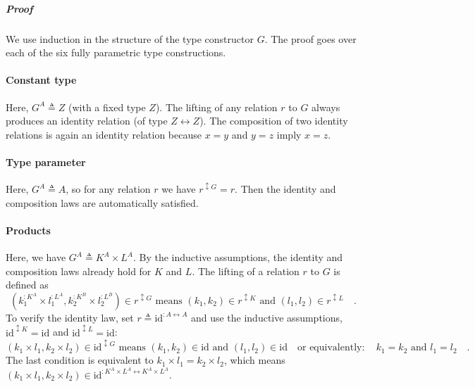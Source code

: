 \subparagraph{Proof}

We use induction in the structure of the type constructor $G$. The
proof goes over each of the six fully parametric type constructions.

\paragraph{Constant type}

Here, $G^{A}\triangleq Z$ (with a fixed type $Z$). The lifting of
any relation $r$ to $G$ always produces an identity relation (of
type $Z\leftrightarrow Z$). The composition of two identity relations
is again an identity relation because $x=y$ and $y=z$ imply $x=z$.

\paragraph{Type parameter}

Here, $G^{A}\triangleq A$, so for any relation $r$ we have $r^{\updownarrow G}=r$.
Then the identity and composition laws are automatically satisfied.

\paragraph{Products}

Here, we have $G^{A}\triangleq K^{A}\times L^{A}$. By the inductive
assumptions, the identity and composition laws already hold for $K$
and $L$. The lifting of a relation $r$ to $G$ is defined as
\[
(k_{1}^{:K^{A}}\times l_{1}^{:L^{A}},k_{2}^{:K^{B}}\times l_{2}^{:L^{B}})\in r^{\updownarrow G}\text{ means }(k_{1},k_{2})\in r^{\updownarrow K}\text{ and }(l_{1},l_{2})\in r^{\updownarrow L}\quad.
\]
To verify the identity law, set $r\triangleq\text{id}^{:A\leftrightarrow A}$
and use the inductive assumptions, $\text{id}^{\updownarrow K}=\text{id}$
and $\text{id}^{\updownarrow L}=\text{id}$:
\[
(k_{1}\times l_{1},k_{2}\times l_{2})\in\text{id}^{\updownarrow G}\text{ means }(k_{1},k_{2})\in\text{id}\text{ and }(l_{1},l_{2})\in\text{id}\quad\text{or equivalently}:\quad k_{1}=k_{2}\text{ and }l_{1}=l_{2}\quad.
\]
The last condition is equivalent to $k_{1}\times l_{1}=k_{2}\times l_{2}$,
which means $(k_{1}\times l_{1},k_{2}\times l_{2})\in\text{id}^{:K^{A}\times L^{A}\leftrightarrow K^{A}\times L^{A}}$.


